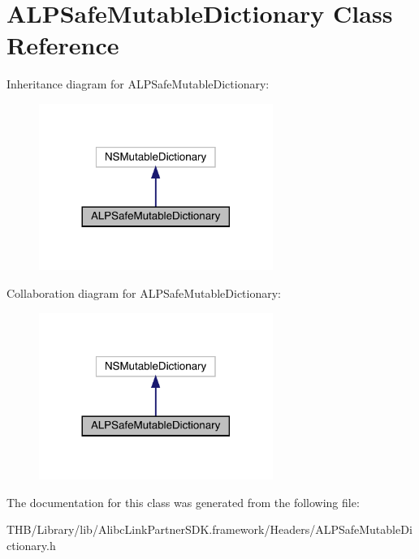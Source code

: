 \hypertarget{interface_a_l_p_safe_mutable_dictionary}{}\section{A\+L\+P\+Safe\+Mutable\+Dictionary Class Reference}
\label{interface_a_l_p_safe_mutable_dictionary}


Inheritance diagram for A\+L\+P\+Safe\+Mutable\+Dictionary\+:\nopagebreak
\begin{figure}[H]
\begin{center}
\leavevmode
\includegraphics[width=216pt]{interface_a_l_p_safe_mutable_dictionary__inherit__graph}
\end{center}
\end{figure}


Collaboration diagram for A\+L\+P\+Safe\+Mutable\+Dictionary\+:\nopagebreak
\begin{figure}[H]
\begin{center}
\leavevmode
\includegraphics[width=216pt]{interface_a_l_p_safe_mutable_dictionary__coll__graph}
\end{center}
\end{figure}


The documentation for this class was generated from the following file\+:\begin{DoxyCompactItemize}
\item 
T\+H\+B/\+Library/lib/\+Alibc\+Link\+Partner\+S\+D\+K.\+framework/\+Headers/A\+L\+P\+Safe\+Mutable\+Dictionary.\+h\end{DoxyCompactItemize}
